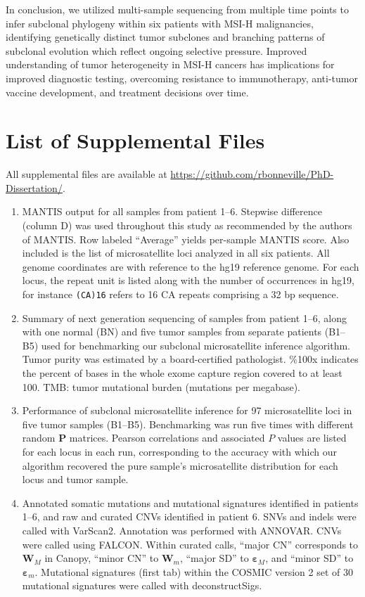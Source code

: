 In conclusion, we utilized multi-sample sequencing from multiple time points to infer subclonal phylogeny within six patients with MSI-H malignancies, identifying genetically distinct tumor subclones and branching patterns of subclonal evolution which reflect ongoing selective pressure. Improved understanding of tumor heterogeneity in MSI-H cancers has implications for improved diagnostic testing, overcoming resistance to immunotherapy, anti-tumor vaccine development, and treatment decisions over time.

\section{List of Supplemental Files}
All supplemental files are available at \url{https://github.com/rbonneville/PhD-Dissertation/}.
\begin{enumerate}
    \renewcommand*{\labelenumi}{S\thechapter{}.\arabic{enumi}. }
    \item MANTIS output for all samples from patient 1--6. Stepwise difference (column D) was used throughout this study as recommended by the authors of MANTIS\@. Row labeled ``Average'' yields per-sample MANTIS score. Also included is the list of microsatellite loci analyzed in all six patients. All genome coordinates are with reference to the hg19 reference genome. For each locus, the repeat unit is listed along with the number of occurrences in hg19, for instance \texttt{(CA)16} refers to 16 CA repeats comprising a 32 bp sequence.
    \item Summary of next generation sequencing of samples from patient 1--6, along with one normal (BN) and five tumor samples from separate patients (B1--B5) used for benchmarking our subclonal microsatellite inference algorithm. Tumor purity was estimated by a board-certified pathologist. \%100x indicates the percent of bases in the whole exome capture region covered to at least 100\texttimes{}. TMB: tumor mutational burden (mutations per megabase).
	\item Performance of subclonal microsatellite inference for 97 microsatellite loci in five tumor samples (B1--B5). Benchmarking was run five times with different random $\mathbf{P}$ matrices. Pearson correlations and associated $P$ values are listed for each locus in each run, corresponding to the accuracy with which our algorithm recovered the pure sample's microsatellite distribution for each locus and tumor sample.
    \item Annotated somatic mutations and mutational signatures identified in patients 1--6, and raw and curated CNVs identified in patient 6. SNVs and indels were called with VarScan2. Annotation was performed with ANNOVAR\@. CNVs were called using FALCON\@. Within curated calls, ``major CN'' corresponds to $\mathbf{W}_M$ in Canopy, ``minor CN'' to $\mathbf{W}_m$, ``major SD'' to $\mathbf{\varepsilon}_M$, and ``minor SD'' to $\mathbf{\varepsilon}_m$. Mutational signatures (first tab) within the COSMIC version 2 set of 30 mutational signatures were called with deconstructSigs.

\end{enumerate}
